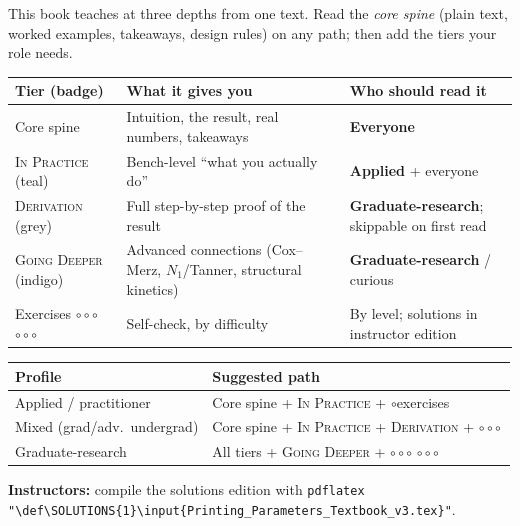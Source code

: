 \documentclass[11pt,a4paper]{article}
\newcommand{\diffA}{\textcolor{green!55!black}{$\circ$}}
\newcommand{\diffB}{\textcolor{orange!80!black}{$\circ\circ$}}
\newcommand{\diffC}{\textcolor{red!70!black}{$\circ\circ\circ$}}
\begin{document}
This book teaches at three depths from one text. Read the \emph{core spine}
(plain text, worked examples, takeaways, design rules) on any path; then add
the tiers your role needs.

\begin{center}\small
\begin{tabular}{p{3.2cm} p{4.0cm} p{5.6cm}}
\toprule
\textbf{Tier (badge)} & \textbf{What it gives you} & \textbf{Who should read it} \\
\midrule
Core spine & Intuition, the result, real numbers, takeaways & \textbf{Everyone} \\
\rule{0pt}{2.4ex}\textsc{In Practice} (teal) & Bench-level ``what you actually do'' & \textbf{Applied} + everyone \\
\textsc{Derivation} (grey) & Full step-by-step proof of the result & \textbf{Graduate-research}; skippable on first read \\
\textsc{Going Deeper} (indigo) & Advanced connections (Cox--Merz, $N_1$/Tanner, structural kinetics) & \textbf{Graduate-research} / curious \\
Exercises \diffA\,\diffB\,\diffC & Self-check, by difficulty & By level; solutions in instructor edition \\
\bottomrule
\end{tabular}
\end{center}

\begin{center}\small
\begin{tabular}{ll}
\toprule
\textbf{Profile} & \textbf{Suggested path} \\
\midrule
Applied / practitioner & Core spine + \textsc{In Practice} + \diffA exercises \\
Mixed (grad/adv.\ undergrad) & Core spine + \textsc{In Practice} + \textsc{Derivation} + \diffA\,\diffB \\
Graduate-research & All tiers + \textsc{Going Deeper} + \diffA\,\diffB\,\diffC \\
\bottomrule
\end{tabular}
\end{center}

\noindent\textbf{Instructors:} compile the solutions edition with
\texttt{pdflatex "\textbackslash def\textbackslash SOLUTIONS\{1\}\textbackslash input\{Printing\_Parameters\_Textbook\_v3.tex\}"}.

\end{document}
